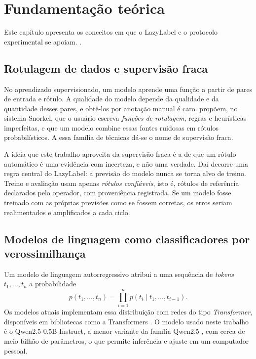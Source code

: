 \chapter{Fundamentação teórica}
\label{cap:fundamentacao}

Este capítulo apresenta os conceitos em que o LazyLabel e o protocolo experimental se apoiam. .

\section{Rotulagem de dados e supervisão fraca}

No aprendizado supervisionado, um modelo aprende uma função a partir de pares de entrada e rótulo. A qualidade do modelo depende da qualidade e da quantidade desses pares, e obtê-los por anotação manual é caro.  propõem, no sistema Snorkel, que o usuário escreva \emph{funções de rotulagem}, regras e heurísticas imperfeitas, e que um modelo combine essas fontes ruidosas em rótulos probabilísticos. A essa família de técnicas dá-se o nome de supervisão fraca.

A ideia que este trabalho aproveita da supervisão fraca é a de que um rótulo automático é uma evidência com incerteza, e não uma verdade. Daí decorre uma regra central do LazyLabel: a previsão do modelo nunca se torna alvo de treino. Treino e avaliação usam apenas \emph{rótulos confiáveis}, isto é, rótulos de referência declarados pelo operador, com proveniência registrada. Se um modelo fosse treinado com as próprias previsões como se fossem corretas, os erros seriam realimentados e amplificados a cada ciclo.

\section{Modelos de linguagem como classificadores por verossimilhança}
\label{sec:llm-classificador}

Um modelo de linguagem autorregressivo atribui a uma sequência de \emph{tokens} $t_1,\dots,t_n$ a probabilidade
\begin{equation}
  p(t_1,\dots,t_n) = \prod_{i=1}^{n} p(t_i \mid t_1,\dots,t_{i-1}).
\end{equation}
Os modelos atuais implementam essa distribuição com redes do tipo \emph{Transformer}, disponíveis em bibliotecas como a Transformers \cite{wolf2020}. O modelo usado neste trabalho é o Qwen2.5-0.5B-Instruct, a menor variante da família Qwen2.5 \cite{qwen25}, com cerca de meio bilhão de parâmetros, o que permite inferência e ajuste em um computador pessoal.

